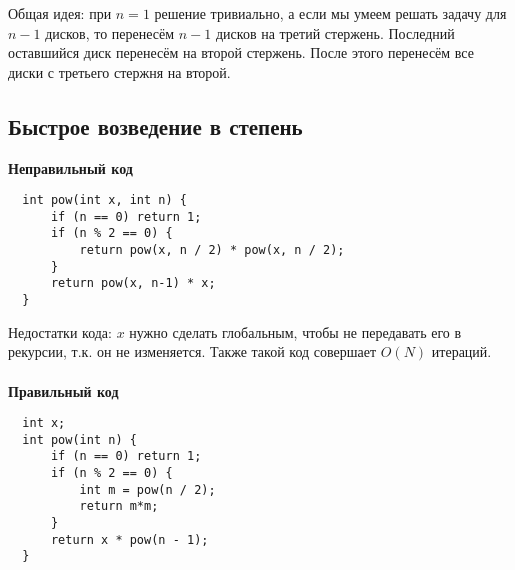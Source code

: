 \documentclass{article}
\begin{document}
Общая идея: при $n = 1$ решение тривиально, а если мы умеем решать задачу для $n-1$ дисков, то перенесём $n-1$
дисков на третий стержень. Последний оставшийся диск перенесём на второй стержень. После этого перенесём все диски
с третьего стержня на второй.

\subsection{Быстрое возведение в степень}

\textbf{Неправильный код}

\noindent
\begin{lstlisting}
  int pow(int x, int n) {
      if (n == 0) return 1;
      if (n % 2 == 0) {
          return pow(x, n / 2) * pow(x, n / 2);
      }
      return pow(x, n-1) * x;
  }
\end{lstlisting}

Недостатки кода: $x$ нужно сделать глобальным, чтобы не передавать его в рекурсии, т.к. он не изменяется.
Также такой код совершает $O(N)$ итераций.

\newpage
\paragraph{}
\textbf{Правильный код}

\noindent
\begin{lstlisting}
  int x;
  int pow(int n) {
      if (n == 0) return 1;
      if (n % 2 == 0) {
          int m = pow(n / 2);
          return m*m;
      }
      return x * pow(n - 1);
  }
\end{lstlisting}
\end{document}
